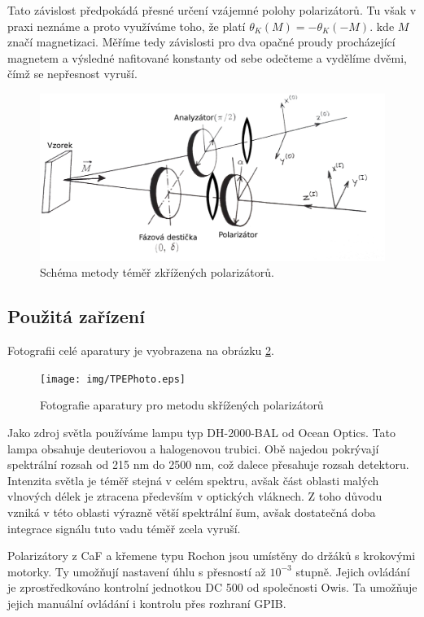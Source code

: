 Tato závislost předpokádá přesné určení vzájemné polohy polarizátorů. Tu však v praxi neznáme a proto využíváme toho, že platí $\theta_K(M)=-\theta_K(-M)$. kde $M$ značí magnetizaci. Měříme tedy závislosti pro dva opačné proudy procházející magnetem a výsledné nafitované konstanty od sebe odečteme a vydělíme dvěmi, čímž se nepřesnost vyruší.

\begin{figure}
    \includegraphics[width=5in]{img/TPEschema.eps}
    \caption{Schéma metody téměř zkřížených polarizátorů.}
    \label{Schema TPE}
\end{figure}

\subsection{Použitá zařízení}
Fotografii celé aparatury je vyobrazena na obrázku \ref{TPE photo}.

\begin{figure}
\begin{center}
\texttt{[image: img/TPEPhoto.eps]}
\caption{Fotografie aparatury pro metodu skřížených polarizátorů}
\label{TPE photo}
\end{center}
\end{figure}

Jako zdroj světla používáme lampu typ DH-2000-BAL od Ocean Optics. Tato lampa obsahuje deuteriovou a halogenovou trubici. Obě najedou pokrývají spektrální rozsah od 215 nm do 2500 nm, což dalece přesahuje rozsah detektoru. Intenzita světla je téměř stejná v celém spektru, avšak část oblasti malých vlnových délek je ztracena především v optických vláknech. Z toho důvodu vzniká v této oblasti výrazně větší spektrální šum, avšak dostatečná doba integrace signálu tuto vadu téměř zcela vyruší.

Polarizátory z CaF a křemene typu Rochon jsou umístěny do držáků s krokovými motorky.  Ty umožňují nastavení úhlu s přesností až $10^{-3}$ stupně. Jejich ovládání je zprostředkováno kontrolní jednotkou DC 500 od společnosti Owis. Ta umožňuje jejich manuální ovládání i kontrolu přes rozhraní GPIB.

